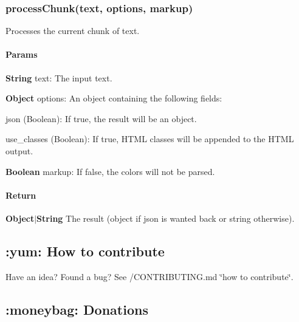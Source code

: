 \subsubsection*{{\ttfamily process\+Chunk(text, options, markup)}}

Processes the current chunk of text. \paragraph*{Params}


\begin{DoxyItemize}
\item {\bfseries String} {\ttfamily text}\+: The input text.
\item {\bfseries Object} {\ttfamily options}\+: An object containing the following fields\+:
\begin{DoxyItemize}
\item {\ttfamily json} (Boolean)\+: If {\ttfamily true}, the result will be an object.
\item {\ttfamily use\+\_\+classes} (Boolean)\+: If {\ttfamily true}, H\+T\+ML classes will be appended to the H\+T\+ML output.
\end{DoxyItemize}
\item {\bfseries Boolean} {\ttfamily markup}\+: If false, the colors will not be parsed.
\end{DoxyItemize}

\paragraph*{Return}


\begin{DoxyItemize}
\item {\bfseries Object$\vert$\+String} The result (object if {\ttfamily json} is wanted back or string otherwise).
\end{DoxyItemize}

\subsection*{\+:yum\+: How to contribute}

Have an idea? Found a bug? See /\+C\+O\+N\+T\+R\+I\+B\+U\+T\+I\+NG.md \char`\"{}how to contribute\char`\"{}.

\subsection*{\+:moneybag\+: Donations}

